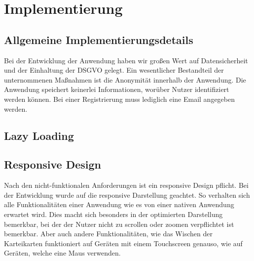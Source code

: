 \chapter{Implementierung}






\section{Allgemeine Implementierungsdetails}

Bei der Entwicklung der Anwendung haben wir großen Wert auf Datensicherheit und der Einhaltung der DSGVO gelegt.
Ein wesentlicher Bestandteil der unternommenen Maßnahmen ist die Anonymität innerhalb der Anwendung.
Die Anwendung speichert keinerlei Informationen, worüber Nutzer identifiziert werden können.
Bei einer Registrierung muss lediglich eine Email angegeben werden.

\section{Lazy Loading} %



\section{Responsive Design} %
Nach den nicht-funktionalen Anforderungen ist ein responsive Design pflicht.  
Bei der Entwicklung wurde auf die responsive Darstellung geachtet.
So verhalten sich alle Funktionalitäten einer Anwendung wie es von einer nativen Anwendung erwartet wird.
Dies macht sich besonders in der optimierten Darstellung bemerkbar, bei der der Nutzer nicht zu scrollen oder zoomen verpflichtet ist bemerkbar.
Aber auch andere Funktionalitäten, wie das Wischen der Karteikarten funktioniert auf Geräten mit einem Touchscreen genauso, wie auf Geräten, welche eine Maus verwenden.



